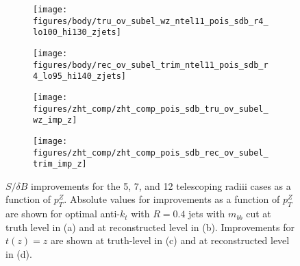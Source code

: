 \begin{figure}[!htbp]\captionsetup{justification=centering}
\begin{center}
\begin{subfigure}[t]{16pc}\centering\texttt{[image: figures/body/tru\_ov\_subel\_wz\_ntel11\_pois\_sdb\_r4\_lo100\_hi130\_zjets]}\caption{}\end{subfigure}
\begin{subfigure}[t]{16pc}\centering\texttt{[image: figures/body/rec\_ov\_subel\_trim\_ntel11\_pois\_sdb\_r4\_lo95\_hi140\_zjets]}\caption{}\end{subfigure}
\begin{subfigure}[t]{16pc}\centering\texttt{[image: figures/zht\_comp/zht\_comp\_pois\_sdb\_tru\_ov\_subel\_wz\_imp\_z]}\caption{}\end{subfigure}
\begin{subfigure}[t]{16pc}\centering\texttt{[image: figures/zht\_comp/zht\_comp\_pois\_sdb\_rec\_ov\_subel\_trim\_imp\_z]}\caption{}\end{subfigure}
\caption{\label{fig:compsdb} $S/\delta B$ improvements for the 5, 7, and 12 telescoping radiii cases as a function of $p_T^Z$.  Absolute values for improvements as a function of $p_T^Z$ are shown for optimal anti-$k_t$ with $R=0.4$ jets with $m_{bb}$ cut at truth level in (a) and at reconstructed level in (b).  Improvements for $t\left(z\right)=z$ are shown at truth-level in (c) and at reconstructed level in (d).}
\end{center}
\end{figure}

\clearpage
